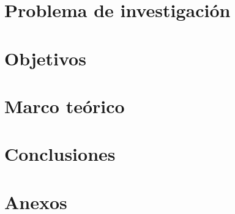 \documentclass[letterpaper, oneside, openright, 12pt]{book}
\begin{document}
  \chapter{Problema de investigación}
  
  \newpage %

  \chapter{Objetivos}
  
  \newpage %

  \chapter{Marco teórico}
  
  \newpage %

  \chapter{Conclusiones}
  
  \newpage %

  \cleardoublepage
  \nocite{*} %
  \printbibliography

  \setcounter{section}{0} %
  \renewcommand{\thesection}{Anexo \arabic{section}}
  \chapter*{Anexos}
  
\end{document}
